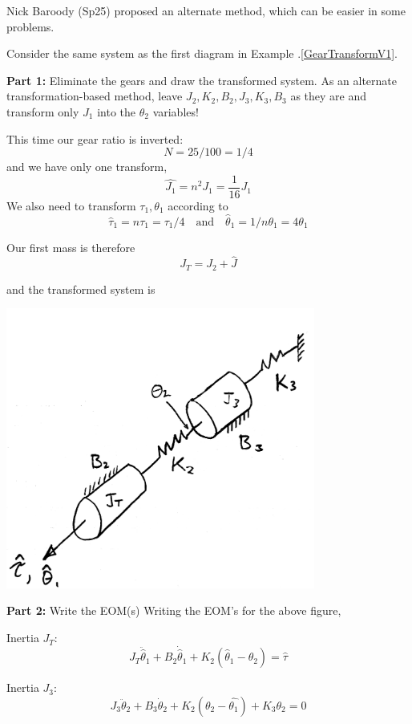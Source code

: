 \begin{Example}

Nick Baroody (Sp25) proposed an alternate method, which can be easier in some problems.

Consider the same system as the first diagram in Example \thechapter.\ref{GearTransformV1}.

\noindent
{\bf Part 1:}
Eliminate the gears and draw the transformed system. As an alternate transformation-based method,
leave $J_2, K_2, B_2, J_3, K_3, B_3$ as they are and transform only $J_1$ into the $\theta_2$ variables!

This time our gear ratio is inverted:
\[
N = 25/100 = 1/4
\]
and we have only one transform,
\[
\hat{J_1} = n^2 J_1 = \frac{1}{16} J_1
\]
We also need to transform $\tau_1, \theta_1$ according to
\[
\hat{\tau}_1 = n\tau_1 = \tau_1/4    \quad \mathrm{and} \quad  \hat{\theta}_1 = 1/n\theta_1 = 4\theta_1
\]

Our first mass is therefore
\[
J_T = J_2 + \hat{J}
\]

and the transformed system is

\includegraphics[width=4.0in]{figs03/R21J35rev.png}


\noindent
{\bf Part 2:}
Write the EOM(s)
\noindent Writing the  EOM's for the above figure,





\noindent Inertia $J_T$:
\[
J_T \ddot{\hat{\theta}}_1 + B_2 \dot{\hat{\theta}}_1 + K_2(\hat{\theta}_1 - \theta_2) = \hat{\tau}
\]

\noindent Inertia $J_3$:
\[
J_3 \ddot{\theta}_2 + B_3 \dot{\theta}_2 + K_2(\theta_2 - \hat{\theta_1}) + K_3 \theta_2 = 0
\]



\end{Example}
